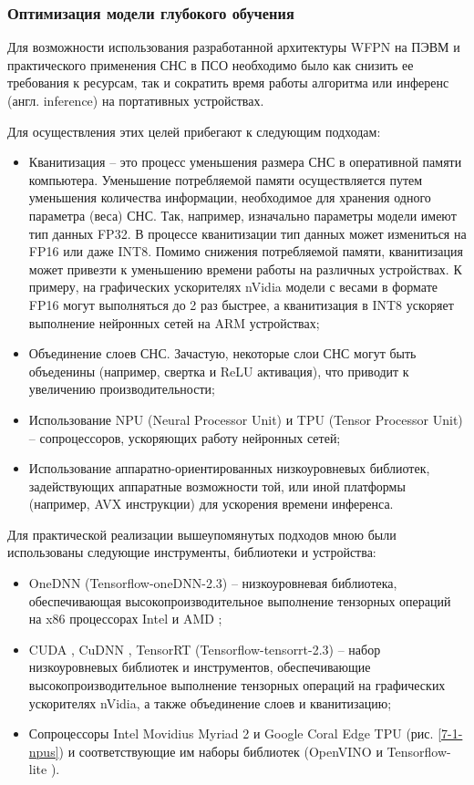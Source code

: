 \subsubsection{Оптимизация модели глубокого обучения} \label{sect-7-1}

Для возможности использования разработанной архитектуры WFPN на ПЭВМ и практического применения СНС в ПСО необходимо было как снизить ее требования к ресурсам, так и сократить время работы алгоритма или инференс (англ. inference) на портативных устройствах.

Для осуществления этих целей прибегают к следующим подходам:
\begin{itemize}
    \item Кванитизация -- это процесс уменьшения размера СНС в оперативной памяти компьютера. Уменьшение потребляемой памяти осуществляется путем уменьшения количества информации, необходимое для хранения одного параметра (веса) СНС. Так, например, изначально параметры модели имеют тип данных FP32. В процессе кванитизации тип данных может измениться на FP16 или даже INT8. Помимо снижения потребляемой памяти, кванитизация может привезти к уменьшению времени работы на различных устройствах. К примеру, на графических ускорителях nVidia модели с весами в формате FP16 могут выполняться до 2 раз быстрее, а кванитизация в INT8 ускоряет выполнение нейронных сетей на ARM устройствах;
    \item Объединение слоев СНС. Зачастую, некоторые слои СНС могут быть объеденины (например, свертка и ReLU активация), что приводит к увеличению производительности;
    \item Использование NPU (Neural Processor Unit) и TPU (Tensor Processor Unit) -- сопроцессоров, ускоряющих работу нейронных сетей;
    \item Использование аппаратно-ориентированных низкоуровневых библиотек, задействующих аппаратные возможности той, или иной платформы (например, AVX инструкции) для ускорения времени инференса.
\end{itemize}

Для практической реализации вышеупомянутых подходов мною были использованы следующие инструменты, библиотеки и устройства:

\begin{itemize}
    \item OneDNN (Tensorflow-oneDNN-2.3) -- низкоуровневая библиотека, обеспечивающая высокопроизводительное выполнение тензорных операций на x86 процессорах Intel и AMD \cite{lib-onednn};
    \item CUDA \cite{lib-cuda}, CuDNN \cite{lib-cudnn}, TensorRT \cite{lib-tensorrt} (Tensorflow-tensorrt-2.3) -- набор низкоуровневых библиотек и инструментов, обеспечивающие высокопроизводительное выполнение тензорных операций на графических ускорителях nVidia, а также объединение слоев и кванитизацию;
    \item Сопроцессоры Intel Movidius Myriad 2 \cite{lib-movidius} и Google Coral Edge TPU \cite{lib-coral} (рис. \ref{7-1-npus}) и соответствующие им наборы библиотек (OpenVINO \cite{lib-openvino} и Tensorflow-lite \cite{lib-tflite}).
\end{itemize}

